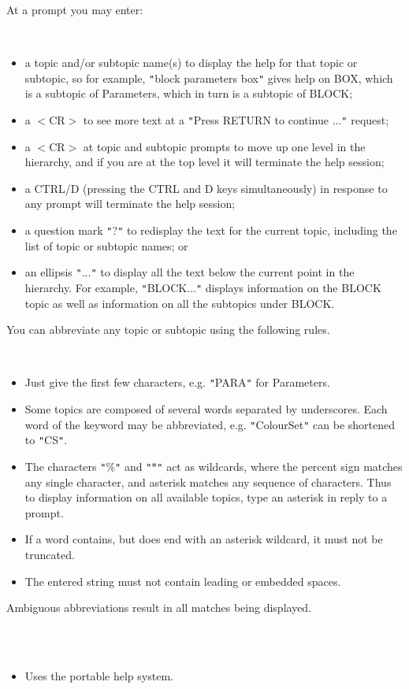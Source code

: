 \documentclass[twoside,11pt]{article}
\renewcommand{\_}{\texttt{\symbol{95}}}
\newcommand{\sstimplementationstatus}[1]{
   \item[{Implementation Status:}] \mbox{} \\[1.3ex] #1}
\newcommand{\sstitemlist}[1]{
  \mbox{} \\
  \vspace{-3.5ex}
  \begin{itemize}
     #1
  \end{itemize}
}
\newcommand{\sstitem}{\item}
\newcommand{\sstimplementationstatus}[1]{
      \item[Implementation Status:] #1
   }
\newcommand{\sstitemlist}[1]{
      \begin{itemize}
         #1
      \end{itemize}
      \\
   }
\newcommand{\sstitem}{\item}
\begin{document}
{{      At a prompt you may enter:

      \sstitemlist{

         \sstitem
            a topic and/or subtopic name(s) to display the help for that
               topic or subtopic, so for example, {\tt "}block parameters box{\tt "}
               gives help on BOX, which is a subtopic of Parameters, which
               in turn is a subtopic of BLOCK;

         \sstitem
            a $<$CR$>$ to see more text at a {\tt "}Press RETURN to continue ...{\tt "}
               request;

         \sstitem
            a $<$CR$>$ at topic and subtopic prompts to move up one level
               in the hierarchy, and if you are at the top level it will
               terminate the help session;

         \sstitem
            a CTRL/D (pressing the CTRL and D keys simultaneously) in
               response to any prompt will terminate the help session;

         \sstitem
            a question mark {\tt "}?{\tt "} to redisplay the text for the current
               topic, including the list of topic or subtopic names; or

         \sstitem
            an ellipsis {\tt "}...{\tt "} to display all the text below the
               current point in the hierarchy.  For example, {\tt "}BLOCK...{\tt "}
               displays information on the BLOCK topic as well as
               information on all the subtopics under BLOCK.

      }
      You can abbreviate any topic or subtopic using the following
      rules.

      \sstitemlist{

         \sstitem
            Just give the first few characters, e.g. {\tt "}PARA{\tt "} for
               Parameters.

         \sstitem
            Some topics are composed of several words separated by
               underscores.  Each word of the keyword may be abbreviated,
               e.g. {\tt "}Colour\_Set{\tt "} can be shortened to {\tt "}C\_S{\tt "}.

         \sstitem
            The characters {\tt "}\%{\tt "} and {\tt "}$*${\tt "} act as wildcards, where the
               percent sign matches any single character, and asterisk
               matches any sequence of characters.  Thus to display
               information on all available topics, type an asterisk in
               reply to a prompt.

         \sstitem
            If a word contains, but does end with an asterisk wildcard,
               it must not be truncated.

         \sstitem
            The entered string must not contain leading or embedded
               spaces.

      }
      Ambiguous abbreviations result in all matches being displayed.
   }
   \sstimplementationstatus{
      \sstitemlist{

         \sstitem
         Uses the portable help system.
      }
   }
}
\end{document}
